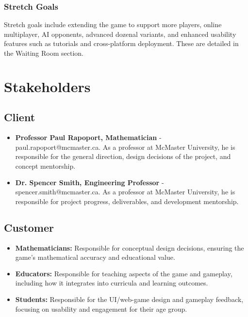 \documentclass[12pt]{article}
\begin{document}
\subsubsection{Stretch Goals}
Stretch goals include extending the game to support more players, online multiplayer, AI opponents, advanced dozenal variants, and enhanced usability features such as tutorials and cross-platform deployment. These are detailed in the Waiting Room section.

\section{Stakeholders}

\subsection{Client}
\begin{itemize}
  \item \textbf{Professor Paul Rapoport, Mathematician} - paul.rapoport@mcmaster.ca. As a professor at McMaster University, he is responsible for the general direction, design decisions of the project, and concept mentorship.
  \item \textbf{Dr. Spencer Smith, Engineering Professor} - spencer.smith@mcmaster.ca. As a professor at McMaster University, he is responsible for project progress, deliverables, and development mentorship.
\end{itemize}

\subsection{Customer}
\begin{itemize}
  \item \textbf{Mathematicians:} Responsible for conceptual design decisions, ensuring the game's mathematical accuracy and educational value.
  \item \textbf{Educators:} Responsible for teaching aspects of the game and gameplay, including how it integrates into curricula and learning outcomes.
  \item \textbf{Students:} Responsible for the UI/web-game design and gameplay feedback, focusing on usability and engagement for their age group.
\end{itemize}
\end{document}
